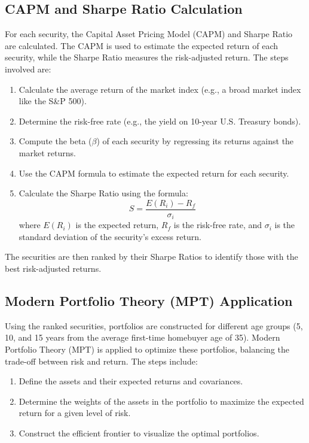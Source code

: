 \subsection{CAPM and Sharpe Ratio Calculation}
For each security, the Capital Asset Pricing Model (CAPM) and Sharpe Ratio are calculated. The CAPM is used to estimate the expected return of each security, while the Sharpe Ratio measures the risk-adjusted return. The steps involved are:
\begin{enumerate}
    \item Calculate the average return of the market index (e.g., a broad market index like the S\&P 500).
    \item Determine the risk-free rate (e.g., the yield on 10-year U.S. Treasury bonds).
    \item Compute the beta ($\beta$) of each security by regressing its returns against the market returns.
    \item Use the CAPM formula to estimate the expected return for each security.
    \item Calculate the Sharpe Ratio using the formula:
    \[
    S = \frac{E(R_i) - R_f}{\sigma_i}
    \]
    where \( E(R_i) \) is the expected return, \( R_f \) is the risk-free rate, and \( \sigma_i \) is the standard deviation of the security’s excess return.
\end{enumerate}

The securities are then ranked by their Sharpe Ratios to identify those with the best risk-adjusted returns.

\subsection{Modern Portfolio Theory (MPT) Application}
Using the ranked securities, portfolios are constructed for different age groups (5, 10, and 15 years from the average first-time homebuyer age of 35). Modern Portfolio Theory (MPT) is applied to optimize these portfolios, balancing the trade-off between risk and return. The steps include:
\begin{enumerate}
    \item Define the assets and their expected returns and covariances.
    \item Determine the weights of the assets in the portfolio to maximize the expected return for a given level of risk.
    \item Construct the efficient frontier to visualize the optimal portfolios.
\end{enumerate}

